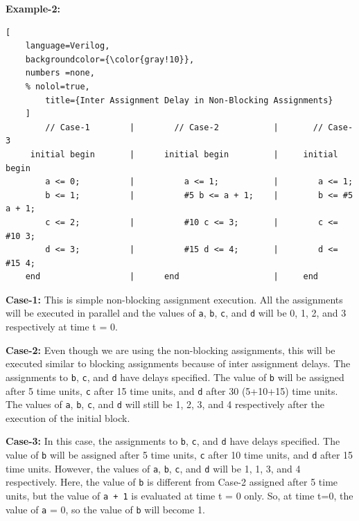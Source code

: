 \documentclass[12pt, a4paper]{article}
\begin{document}
\vspace{1em}

\textbf{Example-2:}

\begin{lstlisting}[
    language=Verilog,
    backgroundcolor={\color{gray!10}},
    numbers =none,
    % nolol=true,
        title={Inter Assignment Delay in Non-Blocking Assignments}
    ]
        // Case-1        |        // Case-2           |       // Case-3
     initial begin       |      initial begin         |     initial begin
        a <= 0;          |          a <= 1;           |        a <= 1;
        b <= 1;          |          #5 b <= a + 1;    |        b <= #5 a + 1;
        c <= 2;          |          #10 c <= 3;       |        c <= #10 3;
        d <= 3;          |          #15 d <= 4;       |        d <= #15 4;
    end                  |      end                   |     end
\end{lstlisting}

\textbf{Case-1:}  This is simple non-blocking assignment execution. All the assignments will be executed in parallel and the values of \texttt{a}, \texttt{b}, \texttt{c}, and \texttt{d} will be 0, 1, 2, and 3 respectively at time t = 0. 

\vspace{0.2em}

\textbf{Case-2:}  Even though we are using the non-blocking assignments, this will be executed similar to blocking assignments because of inter assignment delays.
The assignments to \texttt{b}, \texttt{c}, and \texttt{d} have delays specified. The value of \texttt{b} will be assigned after 5 time units, \texttt{c} after 15 time units, and \texttt{d} after 30 (5+10+15) time units. The values of \texttt{a}, \texttt{b}, \texttt{c}, and \texttt{d} will still be 1, 2, 3, and 4 respectively after the execution of the initial block.

\vspace{0.2em}

\textbf{Case-3:}  In this case, the assignments to \texttt{b}, \texttt{c}, and \texttt{d} have delays specified. The value of \texttt{b} will be assigned after 5 time units, \texttt{c} after 10 time units, and \texttt{d} after 15 time units. However, the values of \texttt{a}, \texttt{b}, \texttt{c}, and \texttt{d} will be 1, 1, 3, and 4 respectively. Here, the value of \texttt{b} is different from Case-2 assigned after 5 time units, but the value of \texttt{a + 1} is evaluated at time t = 0 only. So, at time t=0, the value of \texttt{a} = 0, so the value of \texttt{b} will become 1. 
\end{document}
